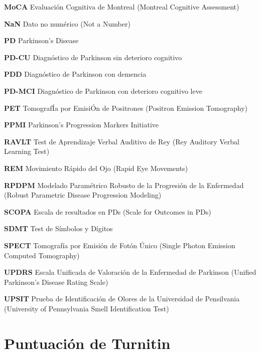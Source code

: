 \begin{description}
	\item \textbf{MoCA} Evaluación Cognitiva de Montreal (Montreal Cognitive Assessment)
	
	\item \textbf{NaN} Dato no numérico (Not a Number)
	
	\item \textbf{PD} Parkinson’s Disease
	
	\item \textbf{PD-CU} Diagnóstico de Parkinson sin deterioro cognitivo
	
	\item \textbf{PDD} Diagnóstico de Parkinson con demencia
	
	\item \textbf{PD-MCI} Diagnóstico de Parkinson con deterioro cognitivo leve
	
	\item \textbf{PET} TomografÍa por EmisiÓn de Positrones (Positron Emission Tomography)
	
	\item \textbf{PPMI} Parkinson’s Progression Markers Initiative
	
	\item \textbf{RAVLT} Test de Aprendizaje Verbal Auditivo de Rey (Rey Auditory Verbal Learning Test)
	
	\item \textbf{REM} Movimiento Rápido del Ojo (Rapid Eye Movements)
	
	\item \textbf{RPDPM} Modelado Paramétrico Robusto de la Progresión de la Enfermedad (Robust Parametric Disease Progression Modeling)
	
	\item \textbf{SCOPA} Escala de resultados en PDs (Scale for Outcomes in PDs) 
	
	\item \textbf{SDMT} Test de Símbolos y Dígitos
	
	\item \textbf{SPECT} Tomografía por Emisión de Fotón Único (Single Photon Emission Computed Tomography)
	
	\item \textbf{UPDRS} Escala Unificada de Valoración de la Enfermedad de Parkinson (Unified Parkinson's Disease Rating Scale)
	
	\item \textbf{UPSIT} Prueba de Identificación de Olores de la Universidad de Pensilvania (University of Pennsylvania Smell Identification Test)
	
\end{description}

\chapter{Puntuación de Turnitin}



